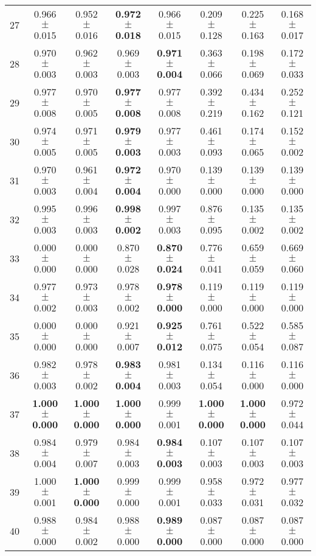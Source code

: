 \begin{table}[!ht]
{\begin{tabular}{r c c c c c c c}
27 & 0.966 $\pm$ 0.015 & 0.952 $\pm$ 0.016 & \textbf{0.972 $\pm$ 0.018} & 0.966 $\pm$ 0.015 & 0.209 $\pm$ 0.128 & 0.225 $\pm$ 0.163 & 0.168 $\pm$ 0.017 \\
28 & 0.970 $\pm$ 0.003 & 0.962 $\pm$ 0.003 & 0.969 $\pm$ 0.003 & \textbf{0.971 $\pm$ 0.004} & 0.363 $\pm$ 0.066 & 0.198 $\pm$ 0.069 & 0.172 $\pm$ 0.033 \\
29 & 0.977 $\pm$ 0.008 & 0.970 $\pm$ 0.005 & \textbf{0.977 $\pm$ 0.008} & 0.977 $\pm$ 0.008 & 0.392 $\pm$ 0.219 & 0.434 $\pm$ 0.162 & 0.252 $\pm$ 0.121 \\
30 & 0.974 $\pm$ 0.005 & 0.971 $\pm$ 0.005 & \textbf{0.979 $\pm$ 0.003} & 0.977 $\pm$ 0.003 & 0.461 $\pm$ 0.093 & 0.174 $\pm$ 0.065 & 0.152 $\pm$ 0.002 \\
31 & 0.970 $\pm$ 0.003 & 0.961 $\pm$ 0.004 & \textbf{0.972 $\pm$ 0.004} & 0.970 $\pm$ 0.000 & 0.139 $\pm$ 0.000 & 0.139 $\pm$ 0.000 & 0.139 $\pm$ 0.000 \\
32 & 0.995 $\pm$ 0.003 & 0.996 $\pm$ 0.003 & \textbf{0.998 $\pm$ 0.002} & 0.997 $\pm$ 0.003 & 0.876 $\pm$ 0.095 & 0.135 $\pm$ 0.002 & 0.135 $\pm$ 0.002 \\
33 & 0.000 $\pm$ 0.000 & 0.000 $\pm$ 0.000 & 0.870 $\pm$ 0.028 & \textbf{0.870 $\pm$ 0.024} & 0.776 $\pm$ 0.041 & 0.659 $\pm$ 0.059 & 0.669 $\pm$ 0.060 \\
34 & 0.977 $\pm$ 0.002 & 0.973 $\pm$ 0.003 & 0.978 $\pm$ 0.002 & \textbf{0.978 $\pm$ 0.000} & 0.119 $\pm$ 0.000 & 0.119 $\pm$ 0.000 & 0.119 $\pm$ 0.000 \\
35 & 0.000 $\pm$ 0.000 & 0.000 $\pm$ 0.000 & 0.921 $\pm$ 0.007 & \textbf{0.925 $\pm$ 0.012} & 0.761 $\pm$ 0.075 & 0.522 $\pm$ 0.054 & 0.585 $\pm$ 0.087 \\
36 & 0.982 $\pm$ 0.003 & 0.978 $\pm$ 0.002 & \textbf{0.983 $\pm$ 0.004} & 0.981 $\pm$ 0.003 & 0.134 $\pm$ 0.054 & 0.116 $\pm$ 0.000 & 0.116 $\pm$ 0.000 \\
37 & \textbf{1.000 $\pm$ 0.000} & \textbf{1.000 $\pm$ 0.000} & \textbf{1.000 $\pm$ 0.000} & 0.999 $\pm$ 0.001 & \textbf{1.000 $\pm$ 0.000} & \textbf{1.000 $\pm$ 0.000} & 0.972 $\pm$ 0.044 \\
38 & 0.984 $\pm$ 0.004 & 0.979 $\pm$ 0.007 & 0.984 $\pm$ 0.003 & \textbf{0.984 $\pm$ 0.003} & 0.107 $\pm$ 0.003 & 0.107 $\pm$ 0.003 & 0.107 $\pm$ 0.003 \\
39 & 1.000 $\pm$ 0.001 & \textbf{1.000 $\pm$ 0.000} & 0.999 $\pm$ 0.000 & 0.999 $\pm$ 0.001 & 0.958 $\pm$ 0.033 & 0.972 $\pm$ 0.031 & 0.977 $\pm$ 0.032 \\
40 & 0.988 $\pm$ 0.000 & 0.984 $\pm$ 0.002 & 0.988 $\pm$ 0.000 & \textbf{0.989 $\pm$ 0.000} & 0.087 $\pm$ 0.000 & 0.087 $\pm$ 0.000 & 0.087 $\pm$ 0.000 \\
\end{tabular}}
\end{table}
